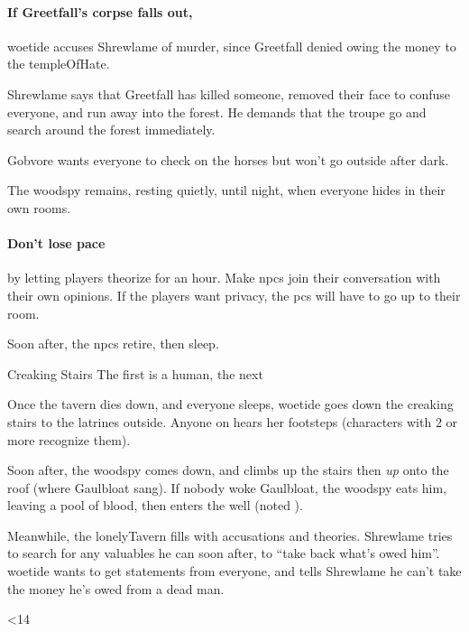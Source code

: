 \documentclass[10pt,twoside]{book}
\begin{document}
\paragraph{If Greetfall's corpse falls out,}
\Gls{woetide} accuses Shrewlame of murder, since Greetfall denied owing the money to the \gls{templeOfHate}.

Shrewlame says that Greetfall has killed someone, removed their face to confuse everyone, and run away into the forest.
He demands that the troupe go and search around the forest immediately.

Gobvore wants everyone to check on the horses but won't go outside after dark.

The \gls{woodspy} remains, resting quietly, until night, when everyone hides in their own rooms.

\paragraph{Don't lose pace}
by letting players theorize for an hour.
Make \glspl{npc} join their conversation with their own opinions.
If the players want privacy, the \glspl{pc} will have to go up to their room.

Soon after, the \glspl{npc} retire, then sleep.

{Creaking Stairs}%
{The first is a human, the next }%

Once the tavern dies down, and everyone sleeps, \gls{woetide} goes down the creaking stairs to the latrines outside.
Anyone on  hears her footsteps (characters with  2 or more recognize them).

\setcounter{wounds}{3}
\woodspy

Soon after, the \gls{woodspy} comes down, and climbs up the stairs then \emph{up} onto the roof (where Gaulbloat sang).
If nobody woke Gaulbloat, the \gls{woodspy} eats him, leaving a pool of blood, then enters the well (noted ).

Meanwhile, the \gls{lonelyTavern} fills with accusations and theories.
Shrewlame tries to search for any valuables he can soon after, to ``take back what's owed him''.
\Gls{woetide} wants to get statements from everyone, and tells Shrewlame he can't take the money he's owed from a dead man.

\newif\ifgotspace
\ifnum\thepage<14
  \gotspacetrue
\else
  \gotspacefalse
\fi
\end{document}
